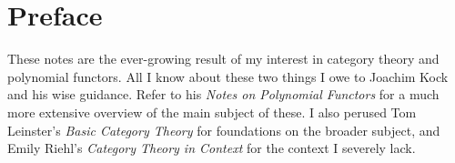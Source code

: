 \section*{Preface}

These notes are the ever-growing result of my interest in category theory and polynomial functors. All I know about these two things I owe to Joachim Kock and his wise guidance. Refer to his \emph{Notes on Polynomial Functors} \cite{kock} for a much more extensive overview of the main subject of these. I also perused Tom Leinster's \emph{Basic Category Theory} \cite{leinster} for foundations on the broader subject, and Emily Riehl's \emph{Category Theory in Context} \cite{riehl} for the context I severely lack.
